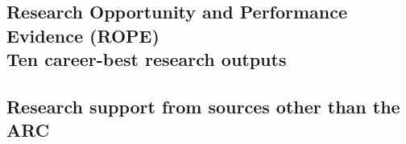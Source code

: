 \documentclass[a4paper]{scrartcl}
\begin{document}
\newpage
\subsection{Research Opportunity and Performance Evidence (ROPE)\\
  Ten career-best research outputs}
\label{sec:ten-best-outputs}



\newpage
\setcounter{section}{7} %
\setcounter{subsection}{0}
\subsection{Research support from sources other than the ARC}
\label{sec:other-research-support}
\end{document}
